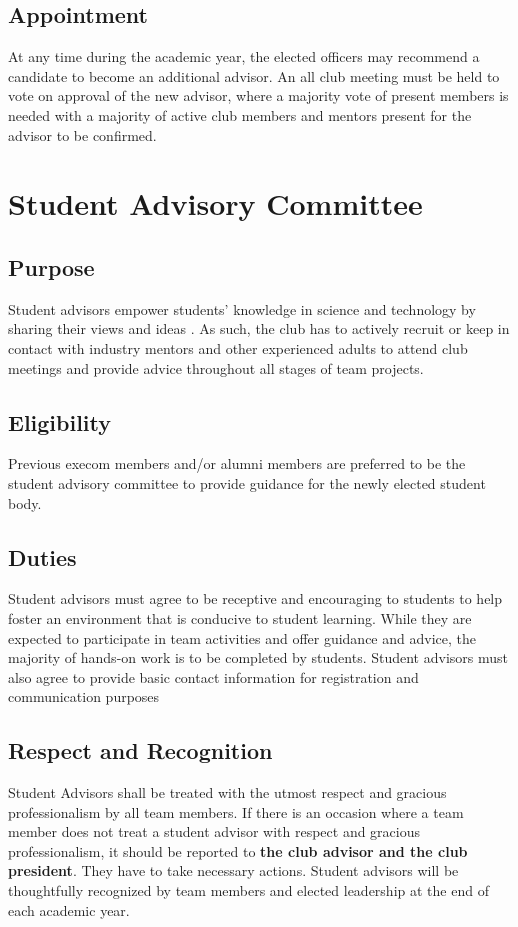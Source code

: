 \subsection{Appointment}
At any time during the academic year, the elected officers may
recommend a candidate to become an additional advisor. An all club
meeting must be held to vote on approval of the new advisor, where a
majority vote of present members is needed with a majority of active club
members and mentors present for the advisor to be confirmed.

\section{Student Advisory Committee}
\subsection{Purpose}
Student advisors empower students' knowledge in science and technology
by sharing their views and ideas . As such, the club has to actively recruit
or keep in contact with industry mentors and other experienced adults to
attend club meetings and provide advice throughout all stages of team
projects.

\subsection{Eligibility}
Previous execom members and/or alumni members are preferred to be the
student advisory committee to provide guidance for the newly elected student
body.

\subsection{Duties}
Student advisors must agree to be receptive and encouraging to students
to help foster an environment that is conducive to student learning. While
they are expected to participate in team activities and offer guidance and
advice, the majority of hands-on work is to be completed by students.
Student advisors must also agree to provide basic contact information for
registration and communication purposes

\subsection{Respect and Recognition}
Student Advisors shall be treated with the utmost respect and gracious
professionalism by all team members. If there is an occasion where a
team member does not treat a student advisor with respect and gracious
professionalism, it should be reported to \textbf{the club advisor and the club
president}. They have to take necessary actions. Student advisors will be
thoughtfully recognized by team members and elected leadership at the
end of each academic year.

